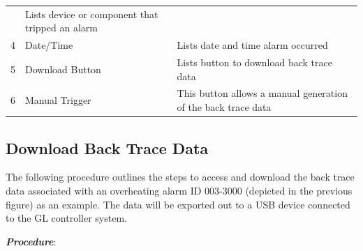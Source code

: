 \begin{longtable}[]{@{}lll@{}}
\begin{minipage}[t]{0.23\columnwidth}
\end{minipage} & \begin{minipage}[t]{0.65\columnwidth}\raggedright
Lists device or component that tripped an alarm\strut
\end{minipage}\tabularnewline
\begin{minipage}[t]{0.04\columnwidth}\raggedright
4\strut
\end{minipage} & \begin{minipage}[t]{0.23\columnwidth}\raggedright
Date/Time\strut
\end{minipage} & \begin{minipage}[t]{0.65\columnwidth}\raggedright
Lists date and time alarm occurred\strut
\end{minipage}\tabularnewline
\begin{minipage}[t]{0.04\columnwidth}\raggedright
5\strut
\end{minipage} & \begin{minipage}[t]{0.23\columnwidth}\raggedright
Download Button\strut
\end{minipage} & \begin{minipage}[t]{0.65\columnwidth}\raggedright
Lists button to download back trace data\strut
\end{minipage}\tabularnewline
\begin{minipage}[t]{0.04\columnwidth}\raggedright
6\strut
\end{minipage} & \begin{minipage}[t]{0.23\columnwidth}\raggedright
Manual Trigger\strut
\end{minipage} & \begin{minipage}[t]{0.65\columnwidth}\raggedright
This button allows a manual generation of the back trace data\strut
\end{minipage}\tabularnewline
\bottomrule
\end{longtable}


\subsection{Download Back Trace
Data}

The following procedure outlines the steps to access and download the
back trace data associated with an overheating alarm ID 003-3000
(depicted in the previous figure) as an example. The data will be
exported out to a USB device connected to the GL controller system.

\textbf{\emph{Procedure}}:

